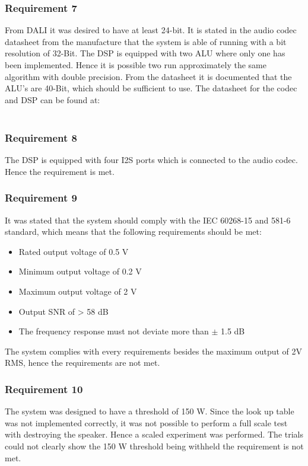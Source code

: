 \subsubsection*{Requirement 7}
From DALI it was desired to have at least 24-bit. It is stated in the audio codec datasheet from the manufacture that the system is able of running with a bit resolution of 32-Bit. The DSP is equipped with two ALU where only one has been implemented. Hence it is possible two run approximately the same algorithm with double precision. From the datasheet it is documented that the ALU's are 40-Bit, which should be sufficient to use. The datasheet for the codec and DSP can be found at: \\
\\

 \vspace*{-5mm} 
\subsubsection*{Requirement 8}
The DSP is equipped with four I2S ports which is connected to the audio codec. Hence the requirement is met.

\vspace*{-5mm}
\subsubsection*{Requirement 9}

It was stated that the system should comply with the IEC 60268-15 and 581-6 standard, which means that the following requirements should be met:
\vspace*{-5mm}
\begin{itemize}\addtolength{\itemsep}{-.35\baselineskip} 
	\item Rated output voltage of 0.5 V
	\item Minimum output voltage of 0.2 V
	\item Maximum output voltage of 2 V
	\item Output SNR of > 58 dB
	\item The frequency response must not deviate more than $\pm$ 1.5 dB
\end{itemize}
\vspace*{-5mm}
The system complies with every requirements besides the maximum output of 2V RMS, hence the requirements are not met.


\subsubsection*{Requirement 10}
The system was designed to have a threshold of 150 W. Since the look up table was not implemented correctly, it was not possible to perform a full scale test with destroying the speaker. Hence a scaled experiment was performed. The trials could not clearly show the 150 W threshold being withheld the requirement is not met.
\vspace*{-5mm}
